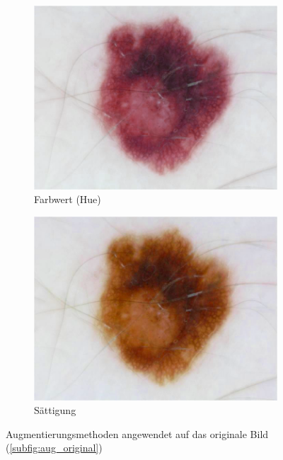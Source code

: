 \begin{figure}[t]
\begin{subfigure}[t]{0.24\linewidth}
		\includegraphics[width=\textwidth]{pics/augmentations/hue.png}
		\caption{Farbwert (Hue)}
		\label{subfig:aug_hue}
	\end{subfigure}
	\begin{subfigure}[t]{0.24\linewidth}
		\includegraphics[width=\textwidth]{pics/augmentations/saturation.png}
		\caption{Sättigung}
		\label{subfig:aug_sat}
	\end{subfigure}
	\caption{Augmentierungsmethoden angewendet auf das originale Bild (\ref{subfig:aug_original})}
    \label{fig:aug}
\end{figure}


